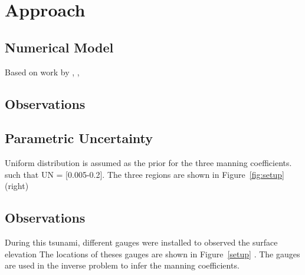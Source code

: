
\section{Approach}






\subsection{Numerical Model}

Based on work by \cite{MacInnes:2013cr}, \cite{Berger:2011du}, \cite{Berger:2011vi}

\subsection{Observations}









\subsection{Parametric Uncertainty}
Uniform distribution is assumed as the prior for the three manning coefficients.
such that UN = [0.005-0.2]. The three regions are shown in Figure~\ref{fig:setup}(right)

\subsection{Observations}
During this tsunami, different gauges were installed to observed the surface elevation
The locations of theses gauges are shown in Figure~\ref{setup} .
The gauges are used in the inverse problem to infer the manning coefficients.
